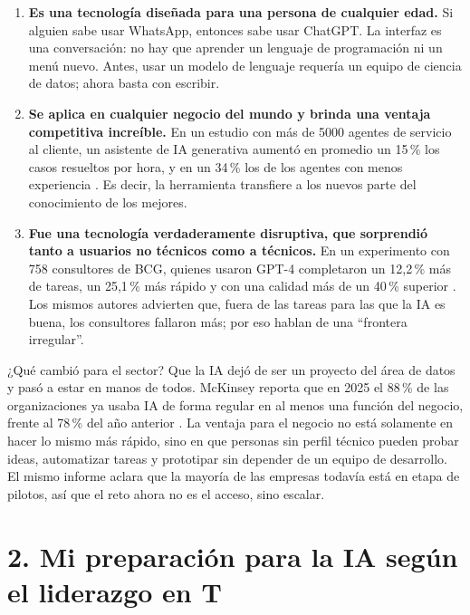 \documentclass[11pt,letterpaper]{article}
\begin{document}
\begin{enumerate}
  \item \textbf{Es una tecnología diseñada para una persona de cualquier
    edad.} Si alguien sabe usar WhatsApp, entonces sabe usar ChatGPT. La
    interfaz es una conversación: no hay que aprender un lenguaje de
    programación ni un menú nuevo. Antes, usar un modelo de lenguaje
    requería un equipo de ciencia de datos; ahora basta con escribir.
  \item \textbf{Se aplica en cualquier negocio del mundo y brinda una ventaja
    competitiva increíble.} En un estudio con más de 5000 agentes de servicio
    al cliente, un asistente de IA generativa aumentó en promedio un 15\,\% los
    casos resueltos por hora, y en un 34\,\% los de los agentes con menos
    experiencia \parencite{brynjolfsson2025}. Es decir, la herramienta
    transfiere a los nuevos parte del conocimiento de los mejores.
  \item \textbf{Fue una tecnología verdaderamente disruptiva, que sorprendió
    tanto a usuarios no técnicos como a técnicos.} En un experimento con 758
    consultores de BCG, quienes usaron GPT-4 completaron un 12,2\,\% más de
    tareas, un 25,1\,\% más rápido y con una calidad más de un 40\,\% superior
    \parencite{dellacqua2023}. Los mismos autores advierten que, fuera de las
    tareas para las que la IA es buena, los consultores fallaron más; por eso
    hablan de una \enquote{frontera irregular}.
\end{enumerate}

¿Qué cambió para el sector? Que la IA dejó de ser un proyecto del área de
datos y pasó a estar en manos de todos. McKinsey reporta que en 2025 el 88\,\%
de las organizaciones ya usaba IA de forma regular en al menos una función del
negocio, frente al 78\,\% del año anterior \parencite{mckinsey2025}. La ventaja
para el negocio no está solamente en hacer lo mismo más rápido, sino en que
personas sin perfil técnico pueden probar ideas, automatizar tareas y
prototipar sin depender de un equipo de desarrollo. El mismo informe aclara
que la mayoría de las empresas todavía está en etapa de pilotos, así que el
reto ahora no es el acceso, sino escalar.

\section*{2. Mi preparación para la IA según el liderazgo en T}
\end{document}
